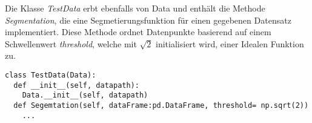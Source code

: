 Die Klasse \textit{TestData} erbt ebenfalls von Data und enthält die Methode \textit{Segmentation}, die eine Segmetierungsfunktion für einen gegebenen Datensatz implementiert. Diese Methode ordnet Datenpunkte basierend auf einem Schwellenwert \textit{threshold}, welche mit $\sqrt{2}$ initialisiert wird, einer Idealen Funktion zu.

\begin{lstlisting}[caption={class TestData}, captionpos=b, label={lst:class IdealFcns}]
class TestData(Data):
  def __init__(self, datapath):
    Data.__init__(self, datapath)
  def Segemtation(self, dataFrame:pd.DataFrame, threshold= np.sqrt(2))
    ...
\end{lstlisting}


